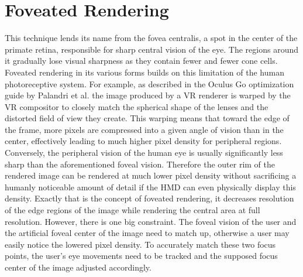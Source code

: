 
\section{Foveated Rendering}
This technique lends its name from the fovea centralis, a spot in the center of the primate retina, responsible for sharp central vision of the eye. The regions around it gradually lose visual sharpness as they contain fewer and fewer cone cells. 
Foveated rendering in its various forms builds on this limitation of the human photoreceptive system. For example, as described in the Oculus Go optimization guide by Palandri et al.\cite{Palandri.2018} the image produced by a VR renderer is warped by the VR compositor to closely match the spherical shape of the lenses and the distorted field of view they create. This warping means that toward the edge of the frame, more pixels are compressed into a given angle of vision than in the center, effectively leading to much higher pixel density for peripheral regions. Conversely, the peripheral vision of the human eye is usually significantly less sharp than the aforementioned foveal vision. Therefore the outer rim of the rendered image can be rendered at much lower pixel density without sacrificing a humanly noticeable amount of detail if the HMD can even physically display this density. Exactly that is the concept of foveated rendering, it decreases resolution of the edge regions of the image while rendering the central area at full resolution. However, there is one big constraint. The foveal vision of the user and the artificial foveal center of the image need to match up, otherwise a user may easily notice the lowered pixel density. To accurately match these two focus points, the user's eye movements need to be tracked and the supposed focus center of the image adjusted accordingly. 

